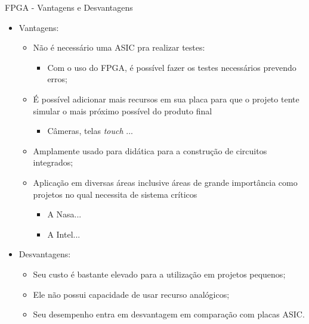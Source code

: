 \documentclass[aspectratio=169]{beamer}
\begin{document}
	\begin{frame}{FPGA - Vantagens e Desvantagens}
		\begin{itemize}
			\item Vantagens:
			\begin{itemize}
				\setlength\itemsep{0.2em}
				\item Não é necessário uma ASIC pra realizar testes:
				\begin{itemize}
					\item Com o uso do FPGA, é possível fazer os testes necessários prevendo erros;
				\end{itemize}
				
				\item É possível adicionar mais recursos em sua placa para que o projeto tente simular o mais próximo possível do produto final
				\begin{itemize}
					\item Câmeras, telas \textit{touch} ...
				\end{itemize}
				
				\item Amplamente usado para didática para a construção de circuitos integrados;
				
				\item Aplicação em diversas áreas inclusive áreas de grande importância como projetos no qual necessita de sistema críticos
				\begin{itemize}
					\item A Nasa...
					\item A Intel...
				\end{itemize}
			\end{itemize}
			
			\bigskip
			
			\item Desvantagens:
			\begin{itemize}
				\setlength\itemsep{0.2em}
				\item Seu custo é bastante elevado para a utilização em projetos pequenos;
				
				\item Ele não possui capacidade de usar recurso analógicos;
				
				\item Seu desempenho entra em desvantagem em comparação com placas ASIC.
			\end{itemize}
		\end{itemize}
	\end{frame}
\end{document}
